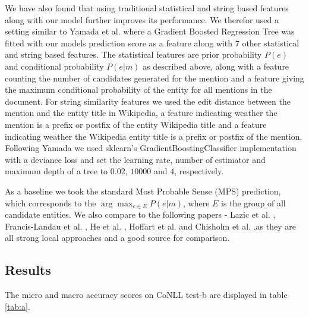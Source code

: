 \documentclass[11pt]{article}
\begin{document}
	We have also found that using traditional statistical and string based features along with our model further improves its performance. We therefor used a setting similar to Yamada et al.  where a Gradient Boosted Regression Tree was fitted with our models prediction score as a feature along with $7$ other statistical and string based features. The statistical features are prior probability $P(e)$ and conditional probability $P(e|m)$ as described above, along with a feature counting the number of candidates generated for the mention and a feature giving the maximum conditional probability of the entity for all mentions in the document. For string similarity features we used the edit distance between the mention and the entity title in Wikipedia, a feature indicating weather the mention is a prefix or postfix of the entity Wikipedia title and a feature indicating weather the Wikipedia entity title is a prefix or postfix of the mention. Following Yamada we used sklearn's GradientBoostingClassifier implementation \cite{pedregosa2011scikit} with a deviance loss and set the learning rate, number of estimator and maximum depth of a tree to $0.02$, $10000$ and $4$, respectively. 
	
	As a baseline we took the standard Most Probable Sense (MPS) prediction, which corresponds to the $\arg\max_{e\in{{E}}}{P(e|m)}$, where $E$ is the group of all candidate entities.
	We also compare to the following papers - Lazic et al. , Francis-Landau et al. , He et al. , Hoffart et al.  and Chisholm et al.  ,as they are all strong local approaches and a good source for comparison.
		
	\subsection{Results}
	
	The micro and macro accuracy scores on CoNLL test-b are displayed in table \ref{tab:a}. 
	
\end{document}
